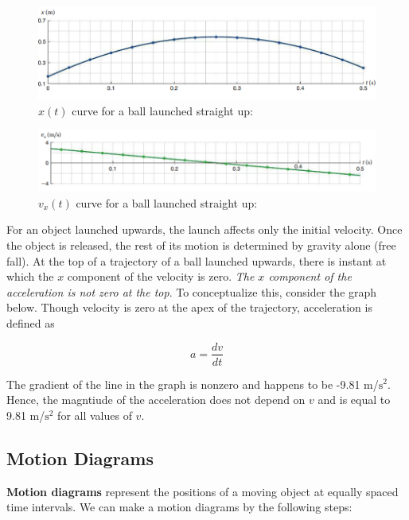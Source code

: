         \begin{figure}[hbt!]
            \centering
            \caption*{$x(t)$ curve for a ball launched straight up:}
            \includegraphics[scale=0.8]{Resources/Projectile_Motion}
        \end{figure}

        \begin{figure}[hbt!]
            \centering
            \caption*{$v_x (t)$ curve for a ball launched straight up:}
            \includegraphics[scale=0.9]{Resources/Projectile_Motion2}
        \end{figure}

        For an object launched upwards, the launch affects only the initial velocity. Once the object is released, the rest of its motion is determined by gravity alone (free fall). At the top of a trajectory of a ball
        launched upwards, there is instant at which the $x$ component of the velocity is zero. \textit{The $x$ component of the acceleration is not zero at the top}. To conceptualize this, consider the graph below.
        Though velocity is zero at the apex of the trajectory, acceleration is defined as

        \[
            a = \frac{dv}{dt}
        \]

        The gradient of the line in the graph is nonzero and happens to be -9.81 m/$\text{s}^2$. Hence, the magntiude of the acceleration does not depend on $v$ and is equal to 9.81 m/$\text{s}^2$ for all values of $v$.



    \pagebreak
    \subsection{Motion Diagrams}
        \textbf{Motion diagrams} represent the positions of a moving object at equally spaced time intervals. We can make a motion diagrams by the following steps: \\

